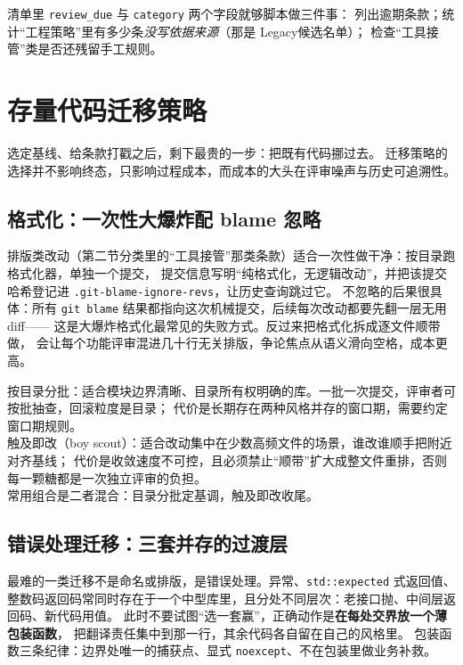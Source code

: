 \documentclass[12pt,a4paper,fontset=fandol]{ctexbook}
\newcommand{\Tp}[1]{\texttt{#1}}
\newcommand{\Bk}{\discretionary{}{}{}}
\newcommand{\Lang}[1]{\textsf{#1}}
\newcommand{\DomTra}{\Lang{Legacy}}
\begin{document}
清单里 \Tp{review\_due} 与 \Tp{category} 两个字段就够脚本做三件事：
列出逾期条款；统计``工程策略''里有多少条\emph{没写依据来源}（那是 \DomTra 候选名单）；
检查``工具接管''类是否还残留手工规则。

\section{存量代码迁移策略}
\label{sec:ch14-migration}

选定基线、给条款打戳之后，剩下最贵的一步：把既有代码挪过去。
迁移策略的选择并不影响终态，只影响过程成本，而成本的大头在评审噪声与历史可追溯性。

\subsection{格式化：一次性大爆炸配 blame 忽略}
\label{sec:ch14-bigbang}

排版类改动（第二节分类里的``工具接管''那类条款）适合一次性做干净：按目录跑格式化器，单独一个提交，
提交信息写明``纯格式化，无逻辑改动''，并把该提交哈希登记进 \Tp{.git{\Bk}-blame{\Bk}-ignore{\Bk}-revs}，让历史查询跳过它。
不忽略的后果很具体：所有 \Tp{git blame} 结果都指向这次机械提交，后续每次改动都要先翻一层无用 diff——
这是大爆炸格式化最常见的失败方式。反过来把格式化拆成逐文件顺带做，
会让每个功能评审混进几十行无关排版，争论焦点从语义滑向空格，成本更高。

\begin{compare}[title={两种增量策略的适用面并不重叠}]
  按目录分批：适合模块边界清晰、目录所有权明确的库。一批一次提交，评审者可按批抽查，回滚粒度是目录；
  代价是长期存在两种风格并存的窗口期，需要约定窗口期规则。\\[4pt]
  触及即改（boy scout）：适合改动集中在少数高频文件的场景，谁改谁顺手把附近对齐基线；
  代价是收敛速度不可控，且必须禁止``顺带''扩大成整文件重排，否则每一颗糖都是一次独立评审的负担。\\[4pt]
  常用组合是二者混合：目录分批定基调，触及即改收尾。
\end{compare}

\subsection{错误处理迁移：三套并存的过渡层}
\label{sec:ch14-err-migration}

最难的一类迁移不是命名或排版，是错误处理。异常、\Tp{std::expected} 式返回值、
整数码返回码常同时存在于一个中型库里，且分处不同层次：老接口抛、中间层返回码、新代码用值。
此时不要试图``选一套赢''，正确动作是\textbf{在每处交界放一个薄包装函数}，
把翻译责任集中到那一行，其余代码各自留在自己的风格里。
包装函数三条纪律：边界处唯一的捕获点、显式 \Tp{noexcept}、不在包装里做业务补救。
\end{document}
